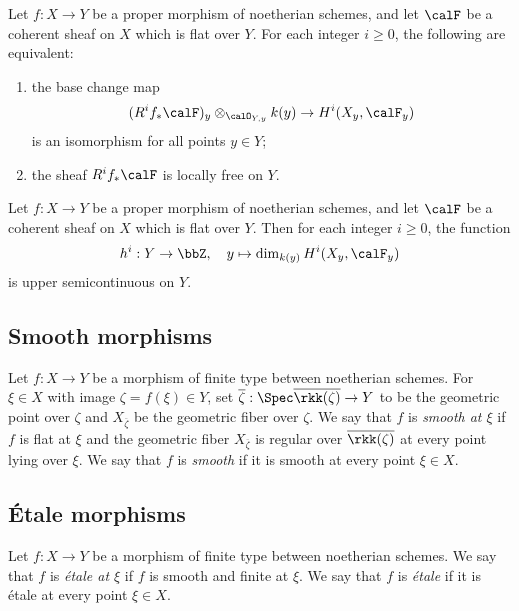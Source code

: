     \begin{theorem}\label{thm:cohomology_and_base_change}
        Let \(f:X\to Y\) be a proper morphism of noetherian schemes, and let \(\calF\) be a coherent sheaf on \(X\) which is flat over \(Y\).
        For each integer \(i\geq 0\), the following are equivalent:
        \begin{enumerate}
            \item the base change map
            \[
                (R^i f_* \calF)_y \otimes_{\calO_{Y,y}} k(y) \to H^i(X_y,\calF_y)
            \]
            is an isomorphism for all points \(y \in Y\);
            \item the sheaf \(R^i f_* \calF\) is locally free on \(Y\).
        \end{enumerate}
    \end{theorem}

    \begin{theorem}\label{thm:semicontinuity_of_cohomology}
        Let \(f:X\to Y\) be a proper morphism of noetherian schemes, and let \(\calF\) be a coherent sheaf on \(X\) which is flat over \(Y\). Then for each integer \(i\geq 0\), the function
        \[
            h^i:Y\to \bbZ, \quad y\mapsto \dim_{k(y)} H^i(X_y,\calF_y)
        \]
        is upper semicontinuous on \(Y\).
    \end{theorem}

\subsection{Smooth morphisms}

    \begin{definition}\label{def:smooth_morphism}
        Let \(f:X\to Y\) be a morphism of finite type between noetherian schemes.
        For \(\xi \in X\) with image \(\zeta = f(\xi) \in Y\), set \(\overline{\zeta}: \Spec \overline{\rkk(\zeta)} \to Y\) to be the geometric point over \(\zeta\) and \(X_{\overline{\zeta}}\) be the geometric fiber over \(\zeta\).
        We say that \(f\) is \emph{smooth at \(\xi\)} if \(f\) is flat at \(\xi\) and the geometric fiber \(X_{\overline{\zeta}}\) is regular over \(\overline{\rkk(\zeta)}\) at every point lying over \(\xi\).
        We say that \(f\) is \emph{smooth} if it is smooth at every point \(\xi \in X\).
    \end{definition}


\subsection{\'Etale morphisms}

    \begin{definition}\label{def:etale_morphism}
        Let \(f:X\to Y\) be a morphism of finite type between noetherian schemes.
        We say that \(f\) is \emph{\'etale at \(\xi\)} if \(f\) is smooth and finite at \(\xi\).
        We say that \(f\) is \emph{\'etale} if it is \'etale at every point \(\xi \in X\).
    \end{definition}

